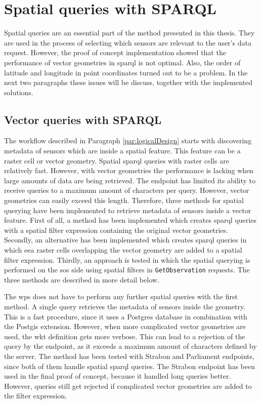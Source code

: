 \section{Spatial queries with SPARQL}
\label{par:spQueries}
Spatial queries are an essential part of the method presented in this thesis. They are used in the process of selecting which sensors are relevant to the user's data request. However, the proof of concept implementation showed that the performance of vector geometries in \ac{sparql} is not optimal. Also, the order of latitude and longitude in point coordinates turned out to be a problem. In the next two paragraphs these issues will be discuss, together with the implemented solutions.     

\subsection{Vector queries with SPARQL}
The workflow described in Paragraph \ref{par:logicalDesign} starts with discovering metadata of sensors which are inside a spatial feature. This feature can be a raster cell or vector geometry. Spatial \ac{sparql} queries with raster cells are relatively fast. However, with vector geometries the performance is lacking when large amounts of data are being retrieved. The endpoint has limited its ability to receive queries to a maximum amount of characters per query. However, vector geometries can easily exceed this length. Therefore, three methods for spatial querying have been implemented to retrieve metadata of sensors inside a vector feature. First of all, a method has been implemented which creates \ac{sparql} queries with a spatial filter expression containing the original vector geometries. Secondly, an alternative has been implemented which creates \ac{sparql} queries in which \ac{eea} raster cells overlapping the vector geometry are added to a spatial filter expression. Thirdly, an approach is tested in which the spatial querying is performed on the \ac{sos} side using spatial filters in \texttt{GetObservation} requests. The three methods are described in more detail below.

The \ac{wps} does not have to perform any further spatial queries with the first method. A single query retrieves the metadata of sensors inside the geometry. This is a fast procedure, since it uses a Postgres database in combination with the Postgis extension. However, when more complicated vector geometries are used, the \ac{wkt} definition gets more verbose. This can lead to a rejection of the query by the endpoint, as it exceeds a maximum amount of characters defined by the server. The method has been tested with Strabon and Parliament endpoints, since both of them handle spatial \ac{sparql} queries. The Strabon endpoint has been used in the final proof of concept, because it handled long queries better. However, queries still get rejected if complicated vector geometries are added to the filter expression.    

